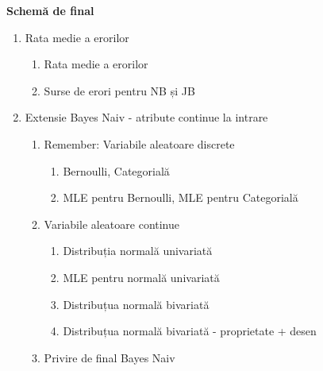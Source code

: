 \documentclass[12pt]{article}
\begin{document}
	\newpage
	\textbf{\large{Schemă de final}}
	\begin{enumerate}
		\item Rata medie a erorilor
		\begin{enumerate}
			\item Rata medie a erorilor
			\item Surse de erori pentru NB și JB
		\end{enumerate}
		\item Extensie Bayes Naiv - atribute continue la intrare
		\begin{enumerate}
			\item Remember: Variabile aleatoare discrete
			\begin{enumerate}
				\item Bernoulli, Categorială
				\item MLE pentru Bernoulli, MLE pentru Categorială
			\end{enumerate}
			\item Variabile aleatoare continue
			\begin{enumerate}
				\item Distribuția normală univariată
				\item MLE pentru normală univariată
				\item Distribuțua normală bivariată
				\item Distribuțua normală bivariată - proprietate + desen
			\end{enumerate}
			\item Privire de final Bayes Naiv
		\end{enumerate}
		
	\end{enumerate}
	
\end{document}
